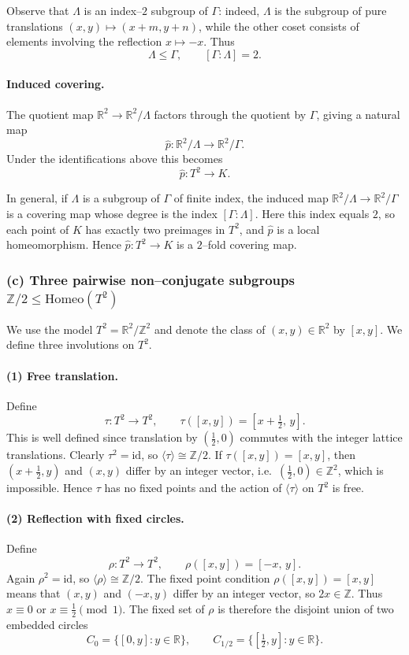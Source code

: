\documentclass[12pt,a4paper]{article}
\theoremstyle{plain}
\theoremstyle{definition}      %
\begin{document}
Observe that $\Lambda$ is an index--$2$ subgroup of $\Gamma$:
indeed, $\Lambda$ is the subgroup of pure translations
$(x,y)\mapsto(x+m,y+n)$, while the other coset consists of elements
involving the reflection $x\mapsto -x$.
Thus
\[
\Lambda \le \Gamma, \qquad [\Gamma:\Lambda]=2.
\]

\paragraph{Induced covering.}
The quotient map $\mathbb{R}^{2}\to\mathbb{R}^{2}/\Lambda$ factors
through the quotient by $\Gamma$, giving a natural map
\[
\hat{p} : \mathbb{R}^{2}/\Lambda \longrightarrow \mathbb{R}^{2}/\Gamma.
\]
Under the identifications above this becomes
\[
\hat{p} : T^{2} \longrightarrow K.
\]

In general, if $\Lambda$ is a subgroup of $\Gamma$ of finite index,
the induced map $\mathbb{R}^{2}/\Lambda \to \mathbb{R}^{2}/\Gamma$
is a covering map whose degree is the index $[\Gamma:\Lambda]$.
Here this index equals $2$, so each point of $K$ has exactly two
preimages in $T^{2}$, and $\hat{p}$ is a local homeomorphism.
Hence $\hat{p}:T^{2}\to K$ is a $2$--fold covering map.

\subsubsection*{(c) Three pairwise non--conjugate subgroups $\mathbb{Z}/2\le\mathrm{Homeo}(T^{2})$}

We use the model $T^{2} = \mathbb{R}^{2}/\mathbb{Z}^{2}$ and denote
the class of $(x,y)\in\mathbb{R}^{2}$ by $[x,y]$.
We define three involutions on $T^{2}$.

\paragraph{(1) Free translation.}
Define
\[
\tau:T^{2}\to T^{2}, \qquad \tau([x,y]) = [x+\tfrac12,\,y].
\]
This is well defined since translation by $(\tfrac12,0)$ commutes
with the integer lattice translations.  Clearly $\tau^{2}=\mathrm{id}$,
so $\langle\tau\rangle\cong\mathbb{Z}/2$.
If $\tau([x,y])=[x,y]$, then $(x+\tfrac12,y)$ and $(x,y)$ differ by an
integer vector, i.e.\ $(\tfrac12,0)\in\mathbb{Z}^{2}$, which is impossible.
Hence $\tau$ has no fixed points and the action of $\langle\tau\rangle$
on $T^{2}$ is free.

\paragraph{(2) Reflection with fixed circles.}
Define
\[
\rho:T^{2}\to T^{2}, \qquad \rho([x,y]) = [-x,\,y].
\]
Again $\rho^{2}=\mathrm{id}$, so $\langle\rho\rangle\cong\mathbb{Z}/2$.
The fixed point condition $\rho([x,y])=[x,y]$ means that $(x,y)$ and
$(-x,y)$ differ by an integer vector, so $2x\in\mathbb{Z}$.
Thus $x\equiv 0$ or $x\equiv\tfrac12 \pmod{1}$.
The fixed set of $\rho$ is therefore the disjoint union of two embedded
circles
\[
C_{0} = \{[0,y] : y\in\mathbb{R}\}, \qquad
C_{1/2} = \{[\tfrac12,y] : y\in\mathbb{R}\}.
\]
\end{document}
